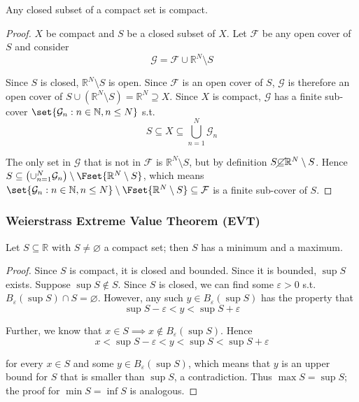 \documentclass{article}
\begin{document}
\begin{theorem}\label{thm:lecture3_compactness_closed_compact}
  Any closed subset of a compact set is compact.
\end{theorem}

\begin{proof}
  $X$ be compact and $S$ be a closed subset of $X$. Let $\mathcal{F}$ be any open cover of $S$ and consider
  \[
    \mathcal{G} = \mathcal{F} \cup \mathbb{R}^N \setminus S
  \]

  Since $S$ is closed, $\mathbb{R}^N \setminus S$ is open. Since $\mathcal{F}$ is an open cover of $S$, $\mathcal{G}$ is therefore an open cover of $S \cup (\mathbb{R}^N \setminus S) = \mathbb{R}^N \supseteq X$. Since $X$ is compact, $\mathcal{G}$ has a finite sub-cover $\set{\mathcal{G}_n: n \in \mathbb{N}, n \le N}$ s.t.
  \[
    S \subseteq X \subseteq \bigcup_{n = 1}^N \mathcal{G}_n
  \]

  The only set in $\mathcal{G}$ that is not in $\mathcal{F}$ is $\mathbb{R}^N \setminus S$, but by definition $S \cancel\subseteq \mathbb{R}^N \setminus S$. Hence $S \subseteq \left(\cup_{n = 1}^N \mathcal{G}_n\right) \setminus \Fset{\mathbb{R}^N \setminus S}$, which means $\set{\mathcal{G}_n: n \in \mathbb{N}, n \le N} \setminus \Fset{\mathbb{R}^N \setminus S} \subseteq \mathcal{F}$ is a finite sub-cover of $S$.
\end{proof}

\subsubsection{Weierstrass Extreme Value Theorem (EVT)}
\label{ssub:weierstrass_extreme_value_theorem_evt_}

\begin{theorem}
  Let $S \subseteq \mathbb{R}$ with $S \ne \varnothing$ a compact set; then $S$ has a minimum and a maximum.
\end{theorem}

\begin{proof}
  Since $S$ is compact, it is closed and bounded. Since it is bounded, $\sup S$ exists. Suppose $\sup S \notin S$.  Since $S$ is closed, we can find some $\varepsilon > 0$ s.t. $B_\varepsilon(\sup S) \cap S = \varnothing$. However, any such $y \in B_\varepsilon(\sup S)$ has the property that
  \[
    \sup S - \varepsilon < y < \sup S + \varepsilon
  \]

  Further, we know that $x \in S \implies x \notin B_{\varepsilon}(\sup S)$. Hence
  \[
    x < \sup S - \varepsilon < y < \sup S < \sup S + \varepsilon
  \]

  for every $x \in S$ and some $y \in B_{\varepsilon}(\sup S)$, which means that $y$ is an upper bound for $S$ that is smaller than $\sup S$, a contradiction. Thus $\max S = \sup S$; the proof for $\min S = \inf S$ is analogous.
\end{proof}
\end{document}
